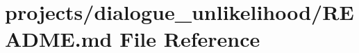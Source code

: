\hypertarget{projects_2dialogue__unlikelihood_2README_8md}{}\section{projects/dialogue\+\_\+unlikelihood/\+R\+E\+A\+D\+ME.md File Reference}
\label{projects_2dialogue__unlikelihood_2README_8md}
